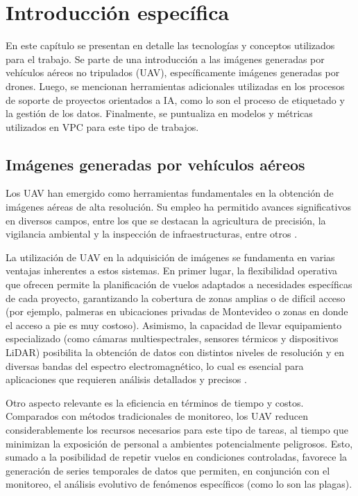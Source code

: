 \chapter{Introducción específica}
\label{Chapter2}

En este capítulo se presentan en detalle las tecnologías y conceptos utilizados para el trabajo. Se parte de una introducción a las imágenes generadas por vehículos aéreos no tripulados (UAV), específicamente imágenes generadas por drones. Luego, se mencionan herramientas adicionales utilizadas en los procesos de soporte de proyectos orientados a IA, como lo son el proceso de etiquetado y la gestión de los datos. Finalmente, se puntualiza en modelos y métricas utilizados en VPC para este tipo de trabajos.

\section{Imágenes generadas por vehículos aéreos}
\label{sec:imgUAV}

Los UAV han emergido como herramientas fundamentales en la obtención de imágenes aéreas de alta resolución. Su empleo ha permitido avances significativos en diversos campos, entre los que se destacan la agricultura de precisión, la vigilancia ambiental y la inspección de infraestructuras, entre otros \citep{mokhtar_image_2023}.

La utilización de UAV en la adquisición de imágenes se fundamenta en varias ventajas inherentes a estos sistemas. En primer lugar, la flexibilidad operativa que ofrecen permite la planificación de vuelos adaptados a necesidades específicas de cada proyecto, garantizando la cobertura de zonas amplias o de difícil acceso (por ejemplo, palmeras en ubicaciones privadas de Montevideo o zonas en donde el acceso a pie es muy costoso). Asimismo, la capacidad de llevar equipamiento especializado (como cámaras multiespectrales, sensores térmicos y dispositivos LiDAR) posibilita la obtención de datos con distintos niveles de resolución y en diversas bandas del espectro electromagnético, lo cual es esencial para aplicaciones que requieren análisis detallados y precisos \citep{unmanned_system_technology_uavdrone_nodate}.

Otro aspecto relevante es la eficiencia en términos de tiempo y costos. Comparados con métodos tradicionales de monitoreo, los UAV reducen considerablemente los recursos necesarios para este tipo de tareas, al tiempo que minimizan la exposición de personal a ambientes potencialmente peligrosos. Esto, sumado a la posibilidad de repetir vuelos en condiciones controladas, favorece la generación de series temporales de datos que permiten, en conjunción con el monitoreo, el análisis evolutivo de fenómenos específicos (como lo son las plagas).

